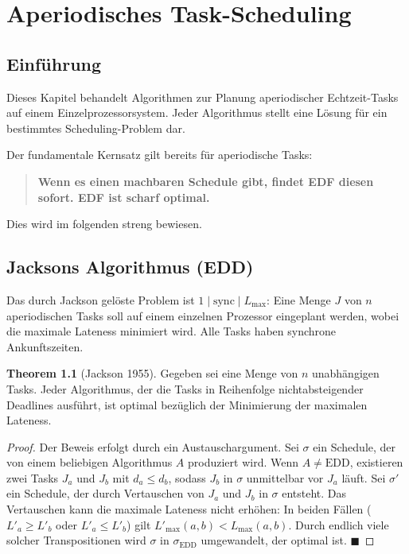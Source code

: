 ﻿\documentclass[a4paper,12pt]{report}
\theoremstyle{definition}
\newtheorem{theorem}{Theorem}[chapter]
\begin{document}
\chapter{Aperiodisches Task-Scheduling}
\label{chap:aperiodisch}

\section{Einführung}

Dieses Kapitel behandelt Algorithmen zur Planung aperiodischer Echtzeit-Tasks
auf einem Einzelprozessorsystem. Jeder Algorithmus stellt eine Lösung für ein
bestimmtes Scheduling-Problem dar.

Der fundamentale Kernsatz gilt bereits für aperiodische Tasks:

\begin{quote}
\textbf{Wenn es einen machbaren Schedule gibt, findet EDF diesen sofort. EDF ist scharf optimal.}
\end{quote}

Dies wird im folgenden streng bewiesen.

\section{Jacksons Algorithmus (EDD)}

Das durch Jackson gelöste Problem ist $1 \mid \text{sync} \mid L_{\max}$: Eine Menge
$J$ von $n$ aperiodischen Tasks soll auf einem einzelnen Prozessor eingeplant werden,
wobei die maximale Lateness minimiert wird. Alle Tasks haben synchrone Ankunftszeiten.

\begin{theorem}[Jackson 1955]
	\label{thm:jackson}
	Gegeben sei eine Menge von $n$ unabhängigen Tasks. Jeder Algorithmus, der die
	Tasks in Reihenfolge nichtabsteigender Deadlines ausführt, ist optimal bezüglich
	der Minimierung der maximalen Lateness.
\end{theorem}

\begin{proof}
	Der Beweis erfolgt durch ein Austauschargument. Sei $\sigma$ ein Schedule, der
	von einem beliebigen Algorithmus $A$ produziert wird. Wenn $A \neq \text{EDD}$,
	existieren zwei Tasks $J_a$ und $J_b$ mit $d_a \leq d_b$, sodass $J_b$ in
	$\sigma$ unmittelbar vor $J_a$ läuft. Sei $\sigma'$ ein Schedule, der durch
	Vertauschen von $J_a$ und $J_b$ in $\sigma$ entsteht. Das Vertauschen kann die
	maximale Lateness nicht erhöhen: In beiden Fällen ($L'_a \geq L'_b$ oder
	$L'_a \leq L'_b$) gilt $L'_{\max}(a,b) < L_{\max}(a,b)$. Durch endlich viele
	solcher Transpositionen wird $\sigma$ in $\sigma_{\text{EDD}}$ umgewandelt, der
	optimal ist. \hfill$\blacksquare$
\end{proof}
\end{document}
